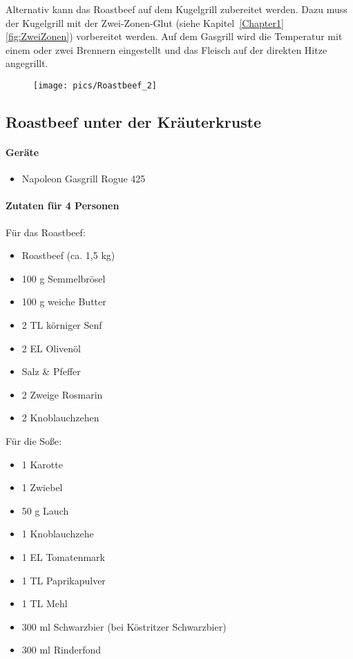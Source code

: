 Alternativ kann das Roastbeef auf dem Kugelgrill zubereitet werden. Dazu
muss der Kugelgrill mit der Zwei-Zonen-Glut (siehe Kapitel~\ref{Chapter1} 
\vref{fig:ZweiZonen}) vorbereitet werden. Auf dem
Gasgrill wird die Temperatur mit einem oder zwei Brennern eingestellt und
das Fleisch auf der direkten Hitze angegrillt.
\newpage
\begin{figure}[htbp]
	\centering
	\begin{minipage}{1\textwidth}
		\centering
		\texttt{[image: pics/Roastbeef\_2]}
		\label{fig:Roastbeef}
	\end{minipage}
\end{figure}
\newpage

\subsection{Roastbeef unter der Kräuterkruste}

\paragraph{Geräte}

\begin{itemize}[noitemsep]
	\item Napoleon Gasgrill Rogue 425
\end{itemize}

\paragraph{Zutaten für 4 Personen}

Für das Roastbeef:

\begin{itemize}[noitemsep]
	\item Roastbeef (ca. 1,5 kg) 
	\item 100 g Semmelbrösel
	\item 100 g weiche Butter
	\item 2 TL körniger Senf
	\item 2 EL Olivenöl
	\item Salz  \& Pfeffer
	\item 2 Zweige Rosmarin
	\item 2 Knoblauchzehen
\end{itemize}

Für die Soße:

\begin{itemize}[noitemsep]
\item 1 Karotte
\item 1 Zwiebel
\item 50 g Lauch
\item 1 Knoblauchzehe
\item 1 EL Tomatenmark
\item 1 TL Paprikapulver
\item 1 TL Mehl
\item 300 ml Schwarzbier (bei Köstritzer Schwarzbier)
\item 300 ml Rinderfond
\end{itemize}

